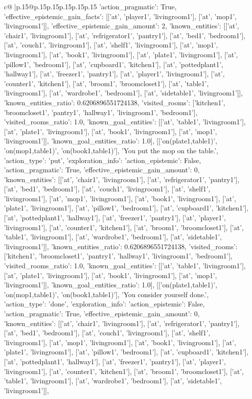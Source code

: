 \documentclass{article}
\begin{document}
{\begin{supertabular}{c@{$\;$}|p{.15\linewidth}@{}p{.15\linewidth}p{.15\linewidth}p{.15\linewidth}p{.15\linewidth}p{.15\linewidth}}
{{{'action_pragmatic': True, 'effective_epistemic_gain_facts': [['at', 'player1', 'livingroom1'], ['at', 'mop1', 'livingroom1']], 'effective_epistemic_gain_amount': 2, 'known_entities': [['at', 'chair1', 'livingroom1'], ['at', 'refrigerator1', 'pantry1'], ['at', 'bed1', 'bedroom1'], ['at', 'couch1', 'livingroom1'], ['at', 'shelf1', 'livingroom1'], ['at', 'mop1', 'livingroom1'], ['at', 'book1', 'livingroom1'], ['at', 'plate1', 'livingroom1'], ['at', 'pillow1', 'bedroom1'], ['at', 'cupboard1', 'kitchen1'], ['at', 'pottedplant1', 'hallway1'], ['at', 'freezer1', 'pantry1'], ['at', 'player1', 'livingroom1'], ['at', 'counter1', 'kitchen1'], ['at', 'broom1', 'broomcloset1'], ['at', 'table1', 'livingroom1'], ['at', 'wardrobe1', 'bedroom1'], ['at', 'sidetable1', 'livingroom1']], 'known_entities_ratio': 0.6206896551724138, 'visited_rooms': ['kitchen1', 'broomcloset1', 'pantry1', 'hallway1', 'livingroom1', 'bedroom1'], 'visited_rooms_ratio': 1.0, 'known_goal_entities': [['at', 'table1', 'livingroom1'], ['at', 'plate1', 'livingroom1'], ['at', 'book1', 'livingroom1'], ['at', 'mop1', 'livingroom1']], 'known_goal_entities_ratio': 1.0}}], [['on(plate1,table1)', 'on(mop1,table1)', 'on(book1,table1)'], 'You put the mop on the table.', {'action_type': 'put', 'exploration_info': {'action_epistemic': False, 'action_pragmatic': True, 'effective_epistemic_gain_amount': 0, 'known_entities': [['at', 'chair1', 'livingroom1'], ['at', 'refrigerator1', 'pantry1'], ['at', 'bed1', 'bedroom1'], ['at', 'couch1', 'livingroom1'], ['at', 'shelf1', 'livingroom1'], ['at', 'mop1', 'livingroom1'], ['at', 'book1', 'livingroom1'], ['at', 'plate1', 'livingroom1'], ['at', 'pillow1', 'bedroom1'], ['at', 'cupboard1', 'kitchen1'], ['at', 'pottedplant1', 'hallway1'], ['at', 'freezer1', 'pantry1'], ['at', 'player1', 'livingroom1'], ['at', 'counter1', 'kitchen1'], ['at', 'broom1', 'broomcloset1'], ['at', 'table1', 'livingroom1'], ['at', 'wardrobe1', 'bedroom1'], ['at', 'sidetable1', 'livingroom1']], 'known_entities_ratio': 0.6206896551724138, 'visited_rooms': ['kitchen1', 'broomcloset1', 'pantry1', 'hallway1', 'livingroom1', 'bedroom1'], 'visited_rooms_ratio': 1.0, 'known_goal_entities': [['at', 'table1', 'livingroom1'], ['at', 'plate1', 'livingroom1'], ['at', 'book1', 'livingroom1'], ['at', 'mop1', 'livingroom1']], 'known_goal_entities_ratio': 1.0}}], [['on(plate1,table1)', 'on(mop1,table1)', 'on(book1,table1)'], 'You consider yourself done.', {'action_type': 'done', 'exploration_info': {'action_epistemic': False, 'action_pragmatic': True, 'effective_epistemic_gain_amount': 0, 'known_entities': [['at', 'chair1', 'livingroom1'], ['at', 'refrigerator1', 'pantry1'], ['at', 'bed1', 'bedroom1'], ['at', 'couch1', 'livingroom1'], ['at', 'shelf1', 'livingroom1'], ['at', 'mop1', 'livingroom1'], ['at', 'book1', 'livingroom1'], ['at', 'plate1', 'livingroom1'], ['at', 'pillow1', 'bedroom1'], ['at', 'cupboard1', 'kitchen1'], ['at', 'pottedplant1', 'hallway1'], ['at', 'freezer1', 'pantry1'], ['at', 'player1', 'livingroom1'], ['at', 'counter1', 'kitchen1'], ['at', 'broom1', 'broomcloset1'], ['at', 'table1', 'livingroom1'], ['at', 'wardrobe1', 'bedroom1'], ['at', 'sidetable1', 'livingroom1']], }}}
\end{supertabular}}
\end{document}
